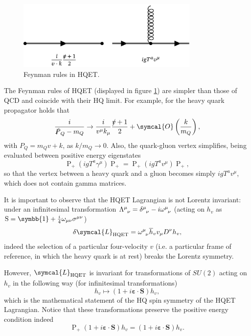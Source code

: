 \begin{figure}
\center
  \includegraphics[width=0.8\textwidth]{figures/pdf/feynman_rules.pdf}
\caption{Feynman rules in HQET.}
\label{fig:hqet_feynman_rules}
\end{figure}

The Feynman rules of HQET (displayed in figure \ref{fig:hqet_feynman_rules}) are simpler than those of QCD and coincide with their HQ limit. For example, for the heavy quark propagator holds that
\begin{equation}
  \frac{i}{\slashed{P}_Q - m_Q} \to \frac{i}{v^\mu k_\mu} \frac{\slashed{v} + 1}{2} + \symcal{O}\left(\frac{k}{m_Q}\right) ,
\end{equation}
with $P_Q = m_Q v + k$, as $k / m_Q \to 0$. Also, the quark-gluon vertex simplifies, being evaluated between positive energy eigenstates 
\begin{equation}
  \operatorname{P}_+ \left( i g T^a \gamma^\mu \right) \operatorname{P}_+ = \operatorname{P}_+ \left( i g T^a v^\mu \right) \operatorname{P}_+ ,
\end{equation}
so that the vertex between a heavy quark and a gluon becomes simply $i g T^a v^\mu$, which does not contain gamma matrices.

It is important to observe that the HQET Lagrangian is not Lorentz invariant: under an infinitesimal transformation $\Lambda\indices{^\mu_\nu} = \delta\indices{^\mu_\nu} - i \omega\indices{^\mu_\nu}$ (acting on $h_v$ as $\operatorname{S} = \symbb{1} + \frac{i}{4} \omega_{\mu \nu} \sigma^{\mu \nu}$)
\begin{equation}
  \delta \symcal{L}_\text{HQET} = \omega\indices{^\mu_\nu} \adj{h}_v v_\mu D^\nu h_v ,
\end{equation}
indeed the selection of a particular four-velocity $v$ (i.e. a particular frame of reference, in which the heavy quark is at rest) breaks the Lorentz symmetry.

However, $\symcal{L}_\text{HQET}$ is invariant for transformations of $SU(2)$ acting on $h_v$ in the following way (for infinitesimal transformations)
\begin{equation}
  h_v \mapsto \left( 1 + i \symbf{\varepsilon} \cdot \symbf{S} \right) h_v ,
\end{equation}
which is the mathematical statement of the HQ spin symmetry of the HQET Lagrangian. Notice that these transformations preserve the positive energy condition indeed
\begin{equation}
  \operatorname{P}_+ \left( 1 + i \symbf{\varepsilon} \cdot \symbf{S} \right) h_v = \left( 1 + i \symbf{\varepsilon} \cdot \symbf{S} \right) h_v .
\end{equation}

